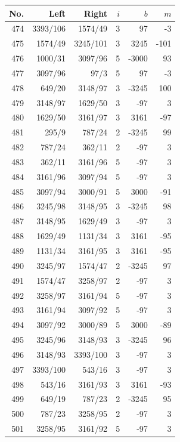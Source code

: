 \documentclass[11pt,a4paper]{article}
\begin{document}
\begin{minipage}[t]{.49\linewidth}\centering\footnotesize\setlength{\tabcolsep}{2pt}\renewcommand{\arraystretch}{1.09}
\begin{tabular*}{\linewidth}{@{}r@{\extracolsep{\fill}}rrrrr@{}}\toprule
No. & Left & Right & $i$ & $b$ & $m$\\\midrule
474 & 3393/106 & 1574/49 & 3 & 97 & -3\\
475 & 1574/49 & 3245/101 & 3 & 3245 & -101\\
476 & 1000/31 & 3097/96 & 5 & -3000 & 93\\
477 & 3097/96 & 97/3 & 5 & 97 & -3\\
478 & 649/20 & 3148/97 & 3 & -3245 & 100\\
479 & 3148/97 & 1629/50 & 3 & -97 & 3\\
480 & 1629/50 & 3161/97 & 3 & 3161 & -97\\
481 & 295/9 & 787/24 & 2 & -3245 & 99\\
482 & 787/24 & 362/11 & 2 & -97 & 3\\
483 & 362/11 & 3161/96 & 5 & -97 & 3\\
484 & 3161/96 & 3097/94 & 5 & -97 & 3\\
485 & 3097/94 & 3000/91 & 5 & 3000 & -91\\
486 & 3245/98 & 3148/95 & 3 & -3245 & 98\\
487 & 3148/95 & 1629/49 & 3 & -97 & 3\\
488 & 1629/49 & 1131/34 & 3 & 3161 & -95\\
489 & 1131/34 & 3161/95 & 3 & 3161 & -95\\
490 & 3245/97 & 1574/47 & 2 & -3245 & 97\\
491 & 1574/47 & 3258/97 & 2 & -97 & 3\\
492 & 3258/97 & 3161/94 & 5 & -97 & 3\\
493 & 3161/94 & 3097/92 & 5 & -97 & 3\\
494 & 3097/92 & 3000/89 & 5 & 3000 & -89\\
495 & 3245/96 & 3148/93 & 3 & -3245 & 96\\
496 & 3148/93 & 3393/100 & 3 & -97 & 3\\
497 & 3393/100 & 543/16 & 3 & -97 & 3\\
498 & 543/16 & 3161/93 & 3 & 3161 & -93\\
499 & 649/19 & 787/23 & 2 & -3245 & 95\\
500 & 787/23 & 3258/95 & 2 & -97 & 3\\
501 & 3258/95 & 3161/92 & 5 & -97 & 3\\

\end{tabular*}
\end{minipage}
\end{document}
